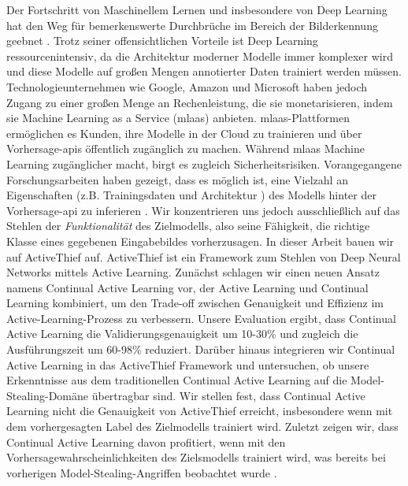 
\Abstract
Der Fortschritt von Maschinellem Lernen und insbesondere von Deep Learning hat den Weg für bemerkenswerte Durchbrüche im Bereich der Bilderkennung geebnet
\parencite{goodfellow2020generative,he2016deep,lecun1989backpropagation}. Trotz seiner offensichtlichen Vorteile ist Deep Learning ressourcenintensiv, da
die Architektur moderner Modelle immer komplexer wird und diese Modelle auf großen Mengen annotierter Daten trainiert werden müssen. Technologieunternehmen wie Google,
Amazon und Microsoft haben jedoch Zugang zu einer großen Menge an Rechenleistung, die sie monetarisieren, indem sie Machine Learning as a Service (\gls{mlaas}) anbieten.
\gls{mlaas}-Plattformen ermöglichen es Kunden, ihre Modelle in der Cloud zu trainieren und über Vorhersage-\glspl{api} öffentlich zugänglich zu machen.
Während \gls{mlaas} Machine Learning zugänglicher macht, birgt es zugleich Sicherheitsrisiken. Vorangegangene Forschungsarbeiten haben gezeigt, dass es möglich ist,
eine Vielzahl an Eigenschaften (z.B. Trainingsdaten \cite{shokri2017membership} und Architektur \cite{oh2019towards}) des Modells hinter der Vorhersage-\gls{api}
zu inferieren \parencite{papernot2017practical,tramer2016stealing}. Wir konzentrieren uns jedoch ausschließlich auf das Stehlen der \textit{Funktionalität} des Zielmodells,
also seine Fähigkeit, die richtige Klasse eines gegebenen Eingabebildes vorherzusagen. In dieser Arbeit bauen wir auf ActiveThief \cite{pal2020activethief} auf. ActiveThief
ist ein Framework zum Stehlen von Deep Neural Networks mittels Active Learning. Zunächst schlagen wir einen neuen Ansatz namens Continual Active Learning vor, der Active Learning
und Continual Learning kombiniert, um den Trade-off zwischen Genauigkeit und Effizienz im Active-Learning-Prozess zu verbessern. Unsere Evaluation ergibt, dass Continual
Active Learning die Validierungsgenauigkeit um 10-30\% und zugleich die Ausführungszeit um 60-98\% reduziert. Darüber hinaus integrieren wir Continual Active Learning in
das ActiveThief Framework und untersuchen, ob unsere Erkenntnisse aus dem traditionellen Continual Active Learning auf die Model-Stealing-Domäne übertragbar sind. Wir stellen fest,
dass Continual Active Learning nicht die Genauigkeit von ActiveThief erreicht, insbesondere wenn mit dem vorhergesagten Label des Zielmodells trainiert wird. Zuletzt zeigen wir,
dass Continual Active Learning davon profitiert, wenn mit den Vorhersagewahrscheinlichkeiten des Zielsmodells trainiert wird, was bereits bei vorherigen Model-Stealing-Angriffen
beobachtet wurde \parencite{pal2020activethief,orekondy2019knockoff}.

